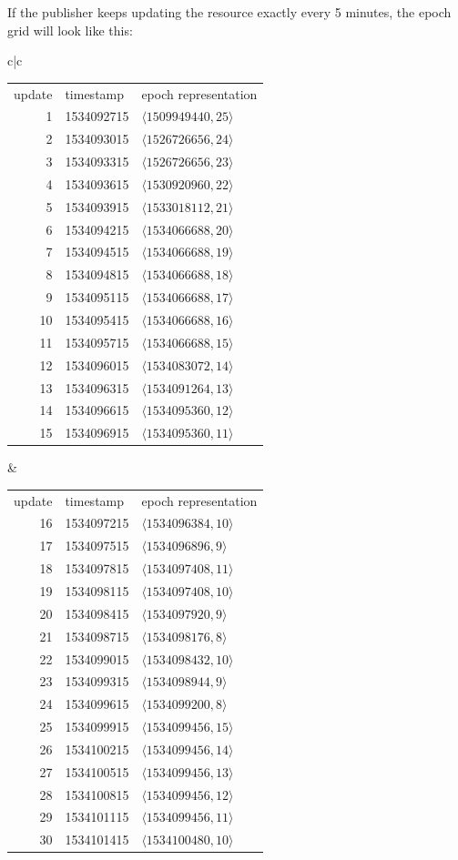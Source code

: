 If the publisher keeps updating the resource exactly every 5 minutes, the epoch grid will look like this:

{\small
\begin{tabular}{c|c}
\begin{tabular}{r|l|l}
update & timestamp & epoch representation\\
1 & 1534092715 & $\langle  1509949440, 25\rangle$\\
2 & 1534093015 & $\langle  1526726656, 24\rangle$\\
3 & 1534093315 & $\langle  1526726656, 23\rangle$\\
4 & 1534093615 & $\langle  1530920960, 22\rangle$\\
5 & 1534093915 & $\langle  1533018112, 21\rangle$\\
6 & 1534094215 & $\langle  1534066688, 20\rangle$\\
7 & 1534094515 & $\langle  1534066688, 19\rangle$\\
8 & 1534094815 & $\langle  1534066688, 18\rangle$\\
9 & 1534095115 & $\langle  1534066688, 17\rangle$\\
10 & 1534095415 & $\langle 1534066688, 16\rangle$\\
11 & 1534095715 & $\langle 1534066688, 15\rangle$\\
12 & 1534096015 & $\langle 1534083072, 14\rangle$\\
13 & 1534096315 & $\langle 1534091264, 13\rangle$\\
14 & 1534096615 & $\langle 1534095360, 12\rangle$\\
15 & 1534096915 & $\langle 1534095360, 11\rangle$
\end{tabular}
&
\begin{tabular}{r|l|l}
update & timestamp & epoch representation\\
16 & 1534097215 & $\langle 1534096384, 10\rangle$\\
17 & 1534097515 & $\langle 1534096896, 9\rangle$\\
18 & 1534097815 & $\langle 1534097408, 11\rangle$\\
19 & 1534098115 & $\langle 1534097408, 10\rangle$\\
20 & 1534098415 & $\langle 1534097920, 9\rangle$\\
21 & 1534098715 & $\langle 1534098176, 8\rangle$\\
22 & 1534099015 & $\langle 1534098432, 10\rangle$\\
23 & 1534099315 & $\langle 1534098944, 9\rangle$\\
24 & 1534099615 & $\langle 1534099200, 8\rangle$\\
25 & 1534099915 & $\langle 1534099456, 15\rangle$\\
26 & 1534100215 & $\langle 1534099456, 14\rangle$\\
27 & 1534100515 & $\langle 1534099456, 13\rangle$\\
28 & 1534100815 & $\langle 1534099456, 12\rangle$\\
29 & 1534101115 & $\langle 1534099456, 11\rangle$\\
30 & 1534101415 & $\langle 1534100480, 10\rangle$
\end{tabular}
\end{tabular}
}


